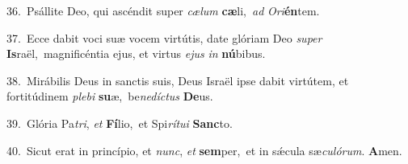 {\numbfont\textcolor{\numbcolor}{36.}}~Psállite Deo, qui ascéndit super \textit{cæ}\-\textit{lum} \textbf{cæ}\-li,~\star \textit{ad} \textit{O}\-\textit{ri}\textbf{én}tem.\par
{\numbfont\textcolor{\numbcolor}{37.}}~Ecce dabit voci suæ vocem virtútis, date glóriam Deo \textit{su}\-\textit{per} \textbf{Is}\-raël,~\star magnificéntia ejus, et virtus \textit{e}\-\textit{jus} \textit{in} \textbf{nú}\-bibus.\par
{\numbfont\textcolor{\numbcolor}{38.}}~Mirábilis Deus in sanctis suis, Deus Israël ipse dabit virtútem, et fortitúdinem \textit{ple}\-\textit{bi} \textbf{su}\-æ,~\star be\-\textit{ne}\-\textit{díc}\textit{tus} \textbf{De}\-us.\par
{\numbfont\textcolor{\numbcolor}{39.}}~Glória Pa\-\textit{tri}\-, \textit{et} \textbf{Fí}\-lio,~\star et Spi\-\textit{rí}\-\textit{tu}\textit{i} \textbf{Sanc}\-to.\par
{\numbfont\textcolor{\numbcolor}{40.}}~Sicut erat in princípio, et \textit{nunc}\-, \textit{et} \textbf{sem}\-per,~\star et in sǽcula sæ\-\textit{cu}\-\textit{ló}\textit{rum}. \textbf{A}\-men.\par
